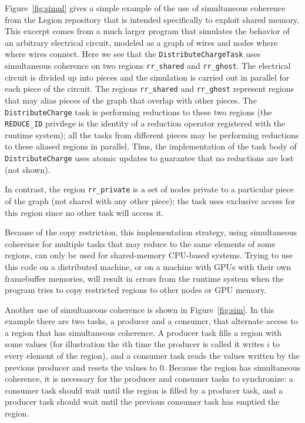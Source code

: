 Figure~\ref{fig:simul} gives a simple example of the use of simultaneous coherence from the Legion repository that is intended specifically to exploit shared memory.  This excerpt comes from a much larger
program that simulates the behavior of an arbitrary electrical circuit, modeled as a graph of wires and nodes where where wires connect.   Here we see that the
{\tt DistributeChargeTask} uses simultaneous coherence on two regions {\tt rr\_shared} and {\tt rr\_ghost}.  The electrical circuit is divided up into pieces
and the simulation is carried out in parallel for each piece of the circuit.  The regions {\tt rr\_shared} and {\tt rr\_ghost} represent regions that may alias pieces
of the graph that overlap with other pieces. The {\tt DistributeCharge} task is performing reductions to these two regions (the {\tt REDUCE\_ID} privilege is the identity
of a reduction operator registered with the runtime system); all the tasks from different pieces may be performing reductions to these aliased regions in parallel.
Thus, the implementation of the task body of {\tt DistributeCharge} uses atomic updates to guarantee that no reductions are lost (not shown).

In contrast, the region {\tt rr\_private} is a set of nodes private to a particular piece of the graph (not shared with any other piece);
the task uses exclusive access for this region since no other task will access it.

Because of the copy restriction, this implementation strategy, using simultaneous coherence for multiple tasks that may reduce to the same elements of some regions,
can only be used for shared-memory CPU-based systems.  Trying to use this code on a distributed machine, or on a machine with GPUs with their own framebuffer memories,
will result in errors from the runtime system when the program tries to copy restricted regions to other nodes or GPU memory.

Another use of simultaneous coherence is shown in Figure~\ref{fig:sim}.  In this example there are two tasks, a producer and a consumer, that alternate
access to a region that has simultaneous coherence.  A producer task fills a region with some values (for illustration the $i$th time the producer is called it writes $i$ to
every element of the region), and a consumer task reads the values written by the previous producer and resets the values to 0.  Because the region has simultaneous coherence, it is necessary for
the producer and consumer tasks to synchronize: a consumer task should wait until the region is filled by a producer task, and a producer task should wait until the previous consumer task has emptied
the region.

